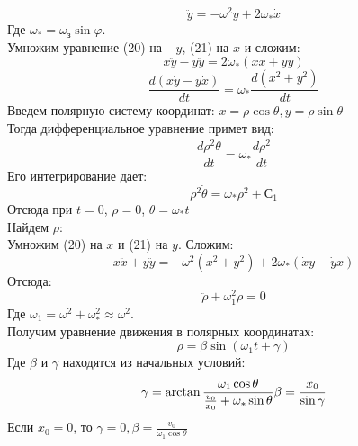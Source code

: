 \begin{equation}
\ddot{y} = - \omega^{2}y + 2\omega_{*}\dot{x}
\end{equation}
Где $\omega_{*} = \omega_{з}\sin\varphi$.\\
Умножим уравнение (20) на $-y$, (21) на $x$ и сложим:
\begin{equation}
x\ddot{y} - y\ddot{y} = 2\omega_{*}(x\dot{x} + y\dot{y})
\end{equation}
\begin{equation}
\frac{d(x\dot{y} - y\dot{x})}{dt}  = \omega_{*}\frac{d(x^2 + y^2)}{dt}
\end{equation}
Введем полярную систему координат: $x = \rho\cos\theta, y = \rho\sin\theta $\\
Тогда дифференциальное уравнение примет вид:
\begin{equation}
\frac{d\rho^2\dot{\theta}}{dt}  = \omega_{*}\frac{d\rho^2}{dt}
\end{equation}
Его интегрирование дает:
\begin{equation}
\rho^2\dot{\theta}  = \omega_{*}\rho^2 + С_1
\end{equation}
Отсюда при $t =0$,  $\rho = 0$,  $\theta = \omega_{*}t $\\
Найдем $\rho$:\\
Умножим (20) на $x$ и (21) на $y$. Сложим:
\begin{equation}
x\ddot{x} + y\ddot{y} = -\omega^{2}(x^2 + y^2) + 2\omega_{*}(\dot{x}y - \dot{y}x)
\end{equation}
Отсюда:
\begin{equation}
\ddot{\rho} + \omega_{1}^{2}\rho = 0
\end{equation}
Где $\omega_{1} = \omega^2 + \omega_{*}^2 \approx \omega^2$.\\
Получим уравнение движения  в полярных координатах:
\begin{equation}
\rho = \beta\sin(\omega_{1}t+ \gamma)
\end{equation}
Где $\beta$ и $\gamma$ находятся из начальных условий:
\begin{equation}
\gamma = \arctan\frac{\omega_{1}\cos\theta}{\frac{v_0}{x_0} + \omega_{*}\sin\theta}\\
\beta = \frac{x_0}{\sin\gamma}
\end{equation}
Если $x_0 = 0$, то $\gamma = 0, \beta = \frac{v_0}{\omega_{1}\cos\theta}$
